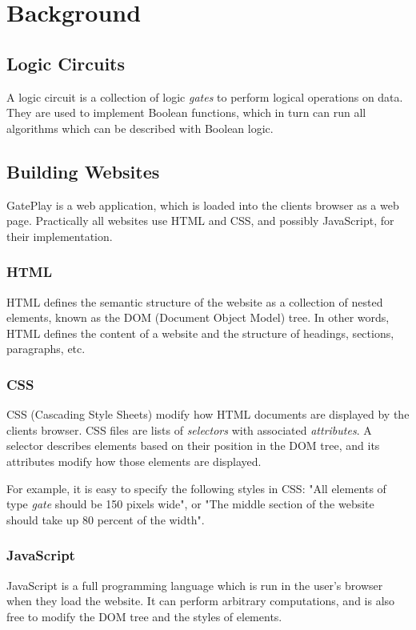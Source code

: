 \chapter{Background}
\label{chapter:background}

\section{Logic Circuits}
\label{sec:circuits}
A logic circuit is a collection of logic \textit{gates} to perform logical operations on data. They are used to implement Boolean functions, which in turn can run all algorithms which can be described with Boolean logic.

\section{Building Websites}
GatePlay is a web application, which is loaded into the clients browser as a web page. Practically all websites use HTML and CSS, and possibly JavaScript, for their implementation.

\subsection{HTML}
HTML defines the semantic structure of the website as a collection of nested elements, known as the DOM (Document Object Model) tree. In other words, HTML defines the content of a website and the structure of headings, sections, paragraphs, etc.

\subsection{CSS}
CSS (Cascading Style Sheets) modify how HTML documents are displayed by the clients browser. CSS files are lists of \textit{selectors} with associated \textit{attributes}. A selector describes elements based on their position in the DOM tree, and its attributes modify how those elements are displayed.

For example, it is easy to specify the following styles in CSS: "All elements of type \textit{gate} should be 150 pixels wide", or "The middle section of the website should take up 80 percent of the width".

\subsection{JavaScript}
JavaScript is a full programming language which is run in the user's browser when they load the website. It can perform arbitrary computations, and is also free to modify the DOM tree and the styles of elements.